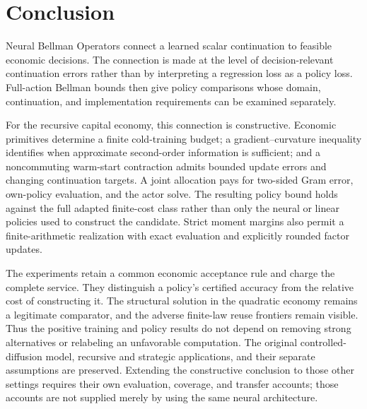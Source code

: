 \section{Conclusion}\label{sec:r34conclusion}
Neural Bellman Operators connect a learned scalar continuation to feasible
economic decisions. The connection is made at the level of decision-relevant
continuation errors rather than by interpreting a regression loss as a policy
loss. Full-action Bellman bounds then give policy comparisons whose domain,
continuation, and implementation requirements can be examined separately.

For the recursive capital economy, this connection is constructive. Economic
primitives determine a finite cold-training budget; a gradient--curvature
inequality identifies when approximate second-order information is sufficient;
and a noncommuting warm-start contraction admits bounded update errors and
changing continuation targets. A joint allocation pays for two-sided Gram
error, own-policy evaluation, and the actor solve. The resulting policy bound
holds against the full adapted finite-cost class rather than only the neural
or linear policies used to construct the candidate. Strict moment margins
also permit a finite-arithmetic realization with exact evaluation and
explicitly rounded factor updates.

The experiments retain a common economic acceptance rule and charge the
complete service. They distinguish a policy's certified accuracy from the
relative cost of constructing it. The structural solution in the quadratic
economy remains a legitimate comparator, and the adverse finite-law reuse
frontiers remain visible. Thus the positive training and policy results do
not depend on removing strong alternatives or relabeling an unfavorable
computation. The original controlled-diffusion model, recursive and strategic
applications, and their separate assumptions are preserved. Extending the
constructive conclusion to those other settings requires their own evaluation,
coverage, and transfer accounts; those accounts are not supplied merely by
using the same neural architecture.
